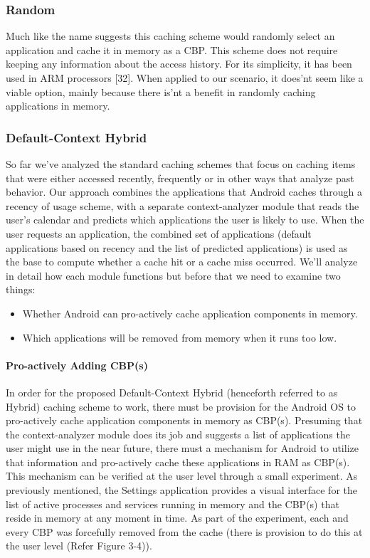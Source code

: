 \documentclass[12pt]{uthesis-v12}  %
\begin{document}
			\subsubsection{Random}
				Much like the name suggests this caching scheme would randomly select an application and cache it in memory as a CBP. This scheme does not require keeping any information about the access history. For its simplicity, it has been used in ARM processors [32]. When applied to our scenario, it does'nt seem like a viable option, mainly because there is'nt a benefit in randomly caching applications in memory.
				 
			\subsubsection{Default-Context Hybrid}
				So far we've analyzed the standard caching schemes that focus on caching items that were either accessed recently, frequently or in other ways that analyze past behavior. Our approach combines the applications that Android caches through a recency of usage scheme, with a separate context-analyzer module that reads the user's calendar and predicts which applications the user is likely to use. When the user requests an application, the combined set of applications (default applications based on recency and the list of predicted applications) is used as the base to compute whether a cache hit or a cache miss occurred. We'll analyze in detail how each module functions but before that we need to examine two things:
				
				\begin{itemize}
					\item Whether Android can pro-actively cache application components in memory.
					\item Which applications will be removed from memory when it runs too low.
				\end{itemize}
								
				\paragraph{Pro-actively Adding CBP(s)}
					In order for the proposed Default-Context Hybrid (henceforth referred to as Hybrid) caching scheme to work, there must be provision for the Android OS to pro-actively cache application components in memory as CBP(s). Presuming that the context-analyzer module does its job and suggests a list of applications the user might use in the near future, there must a mechanism for Android to utilize that information and pro-actively cache these applications in RAM as CBP(s). This mechanism can be verified at the user level through a small experiment. As previously mentioned, the Settings application provides a visual interface for the list of active processes and services running in memory and the CBP(s) that reside in memory at any moment in time. As part of the experiment, each and every CBP was forcefully removed from the cache (there is provision to do this at the user level (Refer Figure 3-4)). 
						
\end{document}
